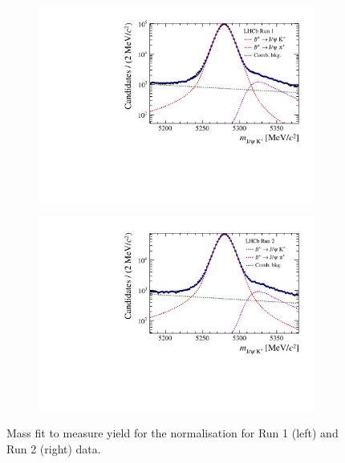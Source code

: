 {{{\begin{figure}[htbp]
    \centering
   \begin{subfigure}[b]{0.48\textwidth}
        \includegraphics[width=  \textwidth]{./Figs/BFAnalysis/BuJpsiK_Run1.pdf}
    \end{subfigure}
    \begin{subfigure}[b]{0.48\textwidth}
       \includegraphics[width=\textwidth]{./Figs/BFAnalysis/BuJpsiK_Run2.pdf}
   \end{subfigure}
    \caption{ Mass fit to measure \bujpsik yield for the normalisation for Run 1 (left) and Run 2 (right) data.}
    \label{fig:Bujpsikyield}
\end{figure}


}}}
